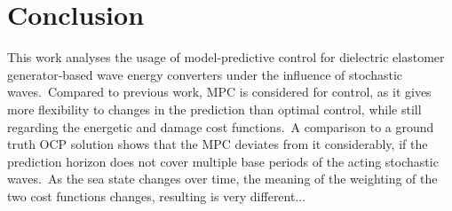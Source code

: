 \section{Conclusion}
This work analyses the usage of model-predictive control for dielectric elastomer generator-based wave energy converters under the influence of stochastic waves.\ 
Compared to previous work, MPC is considered for control, as it gives more flexibility to changes in the prediction than optimal control, while still regarding the energetic and damage cost functions.\ 
A comparison to a ground truth OCP solution shows that the MPC deviates from it considerably, if the prediction horizon does not cover multiple base periods of the acting stochastic waves.\ 
As the sea state changes over time, the meaning of the weighting of the two cost functions changes, resulting is very different...